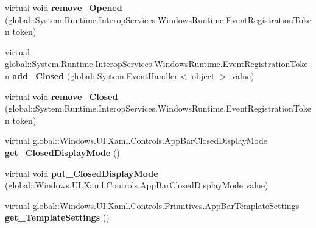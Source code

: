 \begin{DoxyCompactItemize}
\item 
\mbox{\label{class_windows_1_1_u_i_1_1_xaml_1_1_controls_1_1_app_bar_ac34208d86f3483385078caf53adad003}} 
virtual void {\bfseries remove\+\_\+\+Opened} (global\+::\+System.\+Runtime.\+Interop\+Services.\+Windows\+Runtime.\+Event\+Registration\+Token token)
\item 
\mbox{\label{class_windows_1_1_u_i_1_1_xaml_1_1_controls_1_1_app_bar_a4a1f77613cd6cf4250c8b5d04fb9f853}} 
virtual global\+::\+System.\+Runtime.\+Interop\+Services.\+Windows\+Runtime.\+Event\+Registration\+Token {\bfseries add\+\_\+\+Closed} (global\+::\+System.\+Event\+Handler$<$ object $>$ value)
\item 
\mbox{\label{class_windows_1_1_u_i_1_1_xaml_1_1_controls_1_1_app_bar_a3ae78268589fb871f3fba9dbb13e32b4}} 
virtual void {\bfseries remove\+\_\+\+Closed} (global\+::\+System.\+Runtime.\+Interop\+Services.\+Windows\+Runtime.\+Event\+Registration\+Token token)
\item 
\mbox{\label{class_windows_1_1_u_i_1_1_xaml_1_1_controls_1_1_app_bar_a46d37ed2b539c5c23c95c2f3d1bbe080}} 
virtual global\+::\+Windows.\+U\+I.\+Xaml.\+Controls.\+App\+Bar\+Closed\+Display\+Mode {\bfseries get\+\_\+\+Closed\+Display\+Mode} ()
\item 
\mbox{\label{class_windows_1_1_u_i_1_1_xaml_1_1_controls_1_1_app_bar_a1a13c7a737fd9dc3411f69e637231233}} 
virtual void {\bfseries put\+\_\+\+Closed\+Display\+Mode} (global\+::\+Windows.\+U\+I.\+Xaml.\+Controls.\+App\+Bar\+Closed\+Display\+Mode value)
\item 
\mbox{\label{class_windows_1_1_u_i_1_1_xaml_1_1_controls_1_1_app_bar_a2e23c12e2a789785cc3543b45ad5e974}} 
virtual global\+::\+Windows.\+U\+I.\+Xaml.\+Controls.\+Primitives.\+App\+Bar\+Template\+Settings {\bfseries get\+\_\+\+Template\+Settings} ()
\item 
\mbox{\label{class_windows_1_1_u_i_1_1_xaml_1_1_controls_1_1_app_bar_a355e1e4a38bea8069ad912132936c3e5}} 

\end{DoxyCompactItemize}
